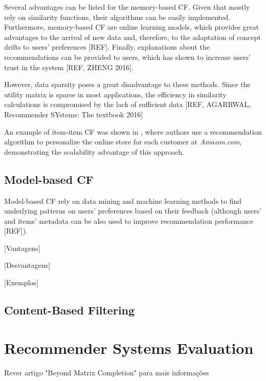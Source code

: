     Several advantages can be listed for the memory-based CF. Given that mostly rely on similarity 
    functions, their algorithms can be easily implemented. Furthermore, memory-based CF are online 
    learning models, which provides great advantages to the arrival of new data and, therefore, 
    to the adaptation of concept drifts to users' preferences [REF]. Finally, explanations about the 
    recommendations can be provided to users, which has shown to increase users' trust in the system 
    [REF, ZHENG 2016].

    However, data sparsity poses a great disadvantage to these methods. Since the utility matrix is 
    sparse in most applications, the efficiency in similarity calculations is compromised by the lack 
    of sufficient data [REF, AGARRWAL, Recommender SYstems: The textbook 2016]
    
    An example of item-item CF was shown in \cite{2003amazon}, where authors use a recommendation 
    algorithm to personalize the online store for each customer at \textit{Amazon.com}, demonstrating 
    the scalability advantage of this approach.

  \subsection{Model-based CF}

  Model-based CF rely on data mining and machine learning methods to find underlying patterns on 
  users' preferences based on their feedback (although users' and items' metadata can be also used to 
  improve recommendation performance [REF]). 

  [Vantagens]

  [Desvantagens]

  [Exemplos]


\subsection{Content-Based Filtering}



\section{Recommender Systems Evaluation}

Rever artigo "Beyond Matrix Completion" para mais informações